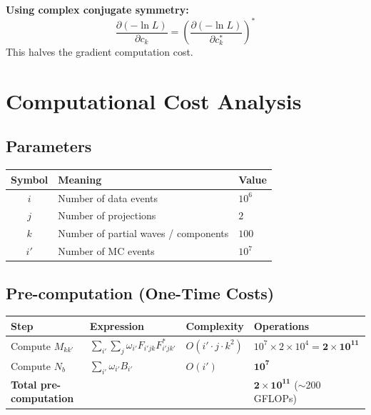 \documentclass[11pt,a4paper]{article}
\begin{document}
\textbf{Using complex conjugate symmetry:}
\begin{equation}
\frac{\partial(-\ln L)}{\partial c_k} = \left(\frac{\partial(-\ln L)}{\partial c_k^*}\right)^*
\end{equation}
This halves the gradient computation cost.

\section{Computational Cost Analysis}

\subsection{Parameters}

\begin{center}
\begin{tabular}{@{}cll@{}}
\toprule
\textbf{Symbol} & \textbf{Meaning} & \textbf{Value} \\ \midrule
$i$ & Number of data events & $10^6$ \\
$j$ & Number of projections & $2$ \\
$k$ & Number of partial waves / components & $100$ \\
$i'$ & Number of MC events & $10^7$ \\ \bottomrule
\end{tabular}
\end{center}

\subsection{Pre-computation (One-Time Costs)}

\begin{center}
\begin{tabular}{@{}llll@{}}
\toprule
\textbf{Step} & \textbf{Expression} & \textbf{Complexity} & \textbf{Operations} \\ \midrule
Compute $M_{kk'}$ & $\sum_{i'} \sum_{j} \omega_{i'} F_{i'jk} F_{i'jk'}^*$ & $O(i' \cdot j \cdot k^2)$ & $10^7 \times 2 \times 10^4 = \mathbf{2 \times 10^{11}}$ \\
Compute $N_b$ & $\sum_{i'} \omega_{i'} B_{i'}$ & $O(i')$ & $\mathbf{10^7}$ \\
\textbf{Total pre-computation} & & & $\mathbf{2 \times 10^{11}}$ ($\sim$200 GFLOPs) \\ \bottomrule
\end{tabular}
\end{center}
\end{document}
